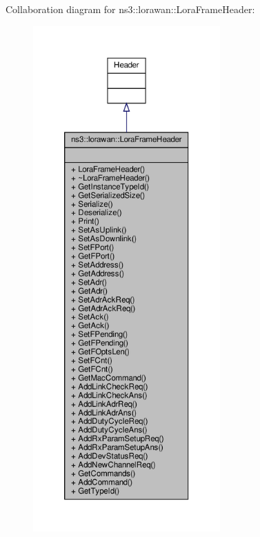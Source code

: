 Collaboration diagram for ns3\+:\+:lorawan\+:\+:Lora\+Frame\+Header\+:
\nopagebreak
\begin{figure}[H]
\begin{center}
\leavevmode
\includegraphics[height=550pt]{classns3_1_1lorawan_1_1LoraFrameHeader__coll__graph}
\end{center}
\end{figure}

